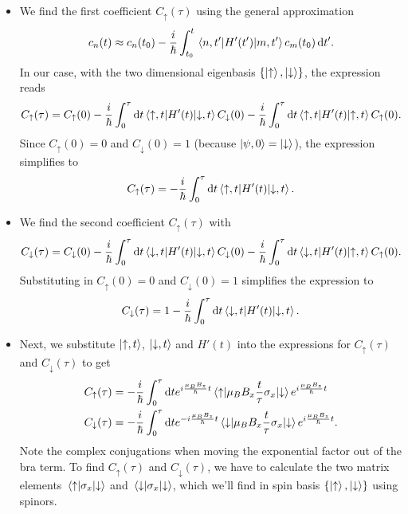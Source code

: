 \documentclass[11pt, a4paper]{article}
\newcommand{\diff}{\mathop{}\!\mathrm{d}} %
\newcommand{\p}{\psi}  %
\newcommand{\ua}{\uparrow}  %
\newcommand{\da}{\downarrow}  %
\begin{document}
\begin{itemize}
	\item We find the first coefficient $ C_{\ua}(\tau) $ using the general approximation
	\begin{equation*}
		c_{n}(t) \approx c_{n}(t_{0}) - \frac{i}{\hbar}\int_{t_{0}}^{t}\mel{n, t'}{H'(t')}{m, t'}c_{m}(t_{0}) \diff t'.
	\end{equation*}
	In our case, with the two dimensional eigenbasis $ \{\ket{\ua}, \ket{\da}\} $, the expression reads
	\begin{equation*}
		C_{\ua}(\tau) = C_{\ua}(0) - \frac{i}{\hbar}\int_{0}^{\tau}\diff t \mel{\ua, t}{H'(t)}{\da, t}C_{\da}(0) - \frac{i}{\hbar}\int_{0}^{\tau}\diff t \mel{\ua, t}{H'(t)}{\ua, t}C_{\ua}(0).
	\end{equation*}
	Since $ C_{\ua}(0) = 0 $ and $ C_{\da}(0) = 1 $ (because $ \ket{\p, 0} = \ket{\da} $), the expression simplifies to
	\begin{equation*}
		C_{\ua}(\tau) = - \frac{i}{\hbar}\int_{0}^{\tau}\diff t \mel{\ua, t}{H'(t)}{\da, t}.
	\end{equation*}

	\item We find the second coefficient $ C_{\ua}(\tau) $ with
	\begin{equation*}
		C_{\da}(\tau) = C_{\da}(0) - \frac{i}{\hbar}\int_{0}^{\tau}\diff t \mel{\da, t}{H'(t)}{\da, t}C_{\da}(0) - \frac{i}{\hbar}\int_{0}^{\tau}\diff t \mel{\da, t}{H'(t)}{\ua, t}C_{\ua}(0).
	\end{equation*}
	Substituting in $ C_{\ua}(0) = 0 $ and $ C_{\da}(0) = 1 $ simplifies the expression to
	\begin{equation*}
		C_{\da}(\tau) = 1 - \frac{i}{\hbar}\int_{0}^{\tau}\diff t \mel{\da, t}{H'(t)}{\da, t}.
	\end{equation*}
	
	\item Next, we substitute $ \ket{\ua, t} $, $ \ket{\da, t} $ and $ H'(t) $ into the expressions for $ C_{\ua}(\tau) $ and $ C_{\da}(\tau) $ to get
	\begin{align*}
		& C_{\ua}(\tau) = - \frac{i}{\hbar}\int_{0}^{\tau} \diff t e^{i\frac{\mu_{B}B_{z}}{\hbar}t}\mel{\ua}{\mu_{B}B_{x}\frac{t}{\tau}\sigma_{x}}{\da} e^{i\frac{\mu_{B}B_{z}}{\hbar}t}\\
		& C_{\da}(\tau) = - \frac{i}{\hbar}\int_{0}^{\tau} \diff t e^{-i\frac{\mu_{B}B_{z}}{\hbar}t}\mel{\da}{\mu_{B}B_{x}\frac{t}{\tau}\sigma_{x}}{\da} e^{i\frac{\mu_{B}B_{z}}{\hbar}t}.
	\end{align*}
	Note the complex conjugations when moving the exponential factor out of the bra term. To find $ C_{\ua}(\tau) $ and $ C_{\da}(\tau) $, we have to calculate the two matrix elements $ \mel{\ua}{\sigma_{x}}{\da} $ and $ \mel{\da}{\sigma_{x}}{\da} $, which we'll find in spin basis $ \{\ket{\ua}, \ket{\da} \} $ using spinors.
	

\end{itemize}
\end{document}
